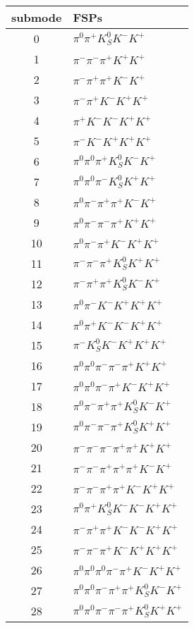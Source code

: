 \begin{table}[h!]
\begin{center}
\begin{tabular}{cl}
\hline
submode& FSPs\\
\hline
0 & $\pi^0 \pi^+ K_S^0 K^- K^+ $ \\
1 & $\pi^- \pi^- \pi^+ K^+ K^+ $ \\
2 & $\pi^- \pi^+ \pi^+ K^- K^+ $ \\
3 & $\pi^- \pi^+ K^- K^+ K^+ $ \\
4 & $\pi^+ K^- K^- K^+ K^+ $ \\
5 & $\pi^- K^- K^+ K^+ K^+ $ \\
6 & $\pi^0 \pi^0 \pi^+ K_S^0 K^- K^+ $ \\
7 & $\pi^0 \pi^0 \pi^- K_S^0 K^+ K^+ $ \\
8 & $\pi^0 \pi^- \pi^+ \pi^+ K^- K^+ $ \\
9 & $\pi^0 \pi^- \pi^- \pi^+ K^+ K^+ $ \\
10 & $\pi^0 \pi^- \pi^+ K^- K^+ K^+ $ \\
11 & $\pi^- \pi^- \pi^+ K_S^0 K^+ K^+ $ \\
12 & $\pi^- \pi^+ \pi^+ K_S^0 K^- K^+ $ \\
13 & $\pi^0 \pi^- K^- K^+ K^+ K^+ $ \\
14 & $\pi^0 \pi^+ K^- K^- K^+ K^+ $ \\
15 & $\pi^- K_S^0 K^- K^+ K^+ K^+ $ \\
16 & $\pi^0 \pi^0 \pi^- \pi^- \pi^+ K^+ K^+ $ \\
17 & $\pi^0 \pi^0 \pi^- \pi^+ K^- K^+ K^+ $ \\
18 & $\pi^0 \pi^- \pi^+ \pi^+ K_S^0 K^- K^+ $ \\
19 & $\pi^0 \pi^- \pi^- \pi^+ K_S^0 K^+ K^+ $ \\
20 & $\pi^- \pi^- \pi^- \pi^+ \pi^+ K^+ K^+ $ \\
21 & $\pi^- \pi^- \pi^+ \pi^+ \pi^+ K^- K^+ $ \\
22 & $\pi^- \pi^- \pi^+ \pi^+ K^- K^+ K^+ $ \\
23 & $\pi^0 \pi^+ K_S^0 K^- K^- K^+ K^+ $ \\
24 & $\pi^- \pi^+ \pi^+ K^- K^- K^+ K^+ $ \\
25 & $\pi^- \pi^- \pi^+ K^- K^+ K^+ K^+ $ \\
26 & $\pi^0 \pi^0 \pi^0 \pi^- \pi^+ K^- K^+ K^+ $ \\
27 & $\pi^0 \pi^0 \pi^- \pi^+ \pi^+ K_S^0 K^- K^+ $ \\
28 & $\pi^0 \pi^0 \pi^- \pi^- \pi^+ K_S^0 K^+ K^+ $ \\

\end{tabular}
\end{center}
\end{table}
